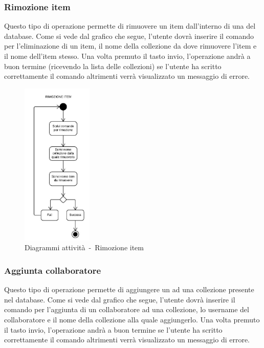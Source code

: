 \documentclass{scalatekids-article}
\begin{document}
\subsubsection{Rimozione item}

Questo tipo di operazione permette di rimuovere un item dall'interno di una
 del database. Come si vede dal grafico che segue, l'utente
dovrà inserire il comando per l'eliminazione di un item, il nome della
collezione da dove rimuovere l'item e il nome dell'item stesso. Una volta
premuto il tasto invio, l'operazione andrà a buon termine (ricevendo la lista
delle collezioni) se l'utente ha scritto correttamente il comando altrimenti
verrà visualizzato un messaggio di errore.

\begin{figure}[H]
  \begin{center}
    \includegraphics[width=0.3\textwidth, keepaspectratio]{img/diagrammiAttivita/rimozioneItem.jpeg}
    \caption{Diagrammi attività\ -\ Rimozione item}
  \end{center}
\end{figure}

\subsubsection{Aggiunta collaboratore}

Questo tipo di operazione permette di aggiungere un  ad
una collezione presente nel database. Come si vede dal grafico che segue,
l'utente dovrà inserire il comando per l'aggiunta di un collaboratore ad una
collezione, lo username del collaboratore e il nome della collezione alla
quale aggiungerlo. Una volta premuto il tasto invio, l'operazione andrà a buon
termine se l'utente ha scritto correttamente il comando altrimenti verrà
visualizzato un messaggio di errore.
\end{document}
